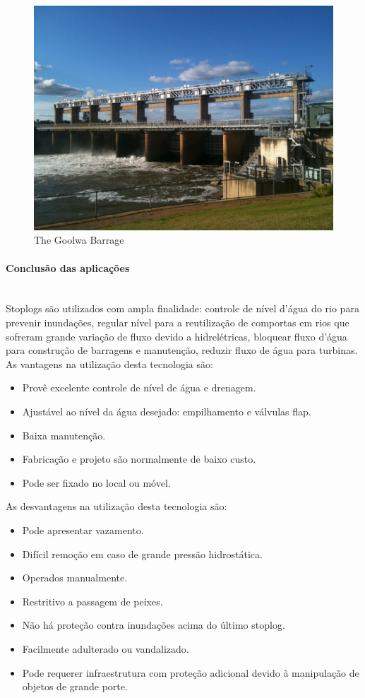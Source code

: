 \begin{figure}[H]
    \centering
    \includegraphics[width=0.8\columnwidth]{figs/pesqbib/6.jpg}
    \caption{The Goolwa Barrage}
    \label{pesqbib_6}
\end{figure}   
 
\paragraph{Conclusão das aplicações}\mbox{}\\
Stoplogs são utilizados com ampla finalidade: controle de nível d’água do rio para prevenir inundações, regular nível para a reutilização de comportas em rios que sofreram grande variação de fluxo devido a hidrelétricas, bloquear fluxo d’água para construção de barragens e manutenção, reduzir fluxo de água para turbinas.
As vantagens na utilização desta tecnologia são:
\begin{itemize}
\item Provê excelente controle de nível de água e drenagem.
\item Ajustável ao nível da água desejado: empilhamento e válvulas flap.
\item Baixa manutenção.
\item Fabricação e projeto são normalmente de baixo custo.
\item Pode ser fixado no local ou móvel.
\end{itemize}

As desvantagens na utilização desta tecnologia são:
\begin{itemize}
  \item Pode apresentar vazamento.
  \item Difícil remoção em caso de grande pressão hidrostática.
  \item Operados manualmente.
  \item Restritivo a passagem de peixes.
  \item Não há proteção contra inundações acima do último stoplog.
  \item Facilmente adulterado ou vandalizado.
  \item Pode requerer infraestrutura com proteção adicional devido à manipulação
  de objetos de grande porte.
\end{itemize}

